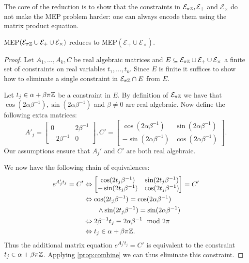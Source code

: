 The core of the reduction is to show that the constraints in
$\mathcal{E}_{\pi\mathbb{Z}},\mathcal{E}_{+}$ and
$\mathcal{E}_{\times}$ do not make the MEP problem harder: one can
always encode them using the matrix product equation.

\begin{proposition}
  MEP$(\mathcal{E}_{\pi\mathbb{Z}} \cup \mathcal{E}_{+} \cup
  \mathcal{E}_{\times})$ reduces to MEP$(\mathcal{E}_{+} \cup
  \mathcal{E}_{\times})$.
\label{lem:pi}
\end{proposition}
\begin{proof}
  Let $A_1,\ldots,A_k,C$ be real algebraic matrices and
  $E\subseteq \mathcal{E}_{\pi\mathbb{Z}} \cup \mathcal{E}_{+} \cup
  \mathcal{E}_{\times}$
  a finite set of constraints on real variables $t_1,\ldots,t_k$.  Since $E$ is
  finite it suffices to show how to eliminate a single constraint
  in $\mathcal{E}_{\pi \mathbb{Z}} \cap E$ from $E$.

  Let $t_{j}\in\alpha+\beta\pi\mathbb{Z}$ be a constraint in $E$.  By definition
of  $\mathcal{E}_{\pi\mathbb{Z}}$
we have
  that $\cos(2\alpha\beta^{-1}),\sin(2\alpha\beta^{-1})$ and
  $\beta\neq0$ are real algebraic.  Now define the following extra
  matrices:
\[A'_j=\begin{bmatrix}0&2\beta^{-1}\\-2\beta^{-1}&0\end{bmatrix},
 C'=\begin{bmatrix}\cos(2\alpha\beta^{-1})&
\sin(2\alpha\beta^{-1})\\-\sin(2\alpha\beta^{-1})&\cos(2\alpha\beta^{-1})\end{bmatrix}.\]
Our assumptions ensure that $A_j'$ and $C'$ are both real algebraic.

We now have the following chain of equivalences:
\begin{align*}
e^{A'_j t_{j}}=C'
&\Leftrightarrow\begin{bmatrix}\cos(2t_{j}\beta^{-1})&
\sin(2t_{j}\beta^{-1})\\-\sin(2t_{j}\beta^{-1})&\cos(2t_{j}\beta^{-1})\end{bmatrix}
=C'\\
&\Leftrightarrow\cos(2t_{j}\beta^{-1})=\cos(2\alpha\beta^{-1}) \\
&\qquad\wedge\sin(2t_{j}\beta^{-1})=\sin(2\alpha\beta^{-1}) \\
&\Leftrightarrow2\beta^{-1}t_{j}\equiv 2\alpha\beta^{-1}\mod 2\pi \\
&\Leftrightarrow t_{j}\in\alpha+\beta\pi\mathbb{Z}.
\end{align*}
Thus the additional matrix equation $e^{A_j't_{j}}=C'$ is equivalent to
the constraint $t_{j}\in\alpha+\beta\pi\mathbb{Z}$.  Applying
\cref{prop:combine} we can thus eliminate this constraint.
\end{proof}

